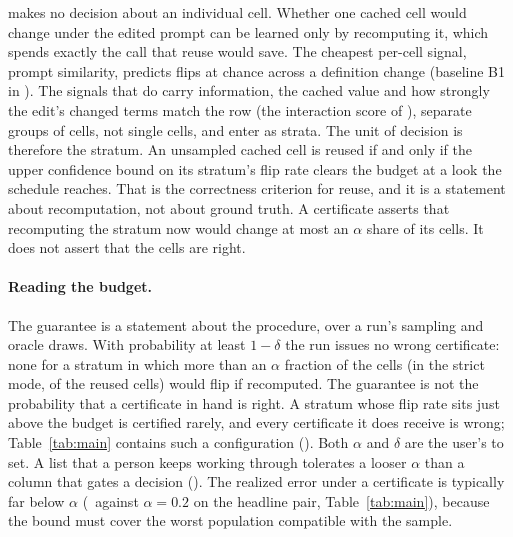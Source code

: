 \sivm{} makes no decision about an individual cell. Whether one cached
cell would change under the edited prompt can be learned only by
recomputing it, which spends exactly the call that reuse would save.
The cheapest per-cell signal, prompt similarity, predicts flips at
chance across a definition change (baseline B1 in
). The signals that do carry information, the
cached value and how strongly the edit's changed terms match the row
(the interaction score of ), separate groups of
cells, not single cells, and enter as strata. The unit of decision is therefore
the stratum. An unsampled cached cell is reused if and only if the
upper confidence bound on its stratum's flip rate clears the budget at
a look the schedule reaches. That is the correctness criterion for
reuse, and it
is a statement about recomputation, not about ground truth. A
certificate asserts that recomputing the stratum now would change at
most an $\alpha$ share of its cells. It does not assert that the cells
are right.

\keeprunin
\paragraph{Reading the budget.} The guarantee is a statement about the
procedure, over a run's sampling and oracle draws. With probability at
least $1-\delta$ the run issues no wrong certificate: none for a stratum
in which more than an $\alpha$ fraction of the cells (in the strict mode,
of the reused cells) would flip if recomputed. The guarantee is not the
probability that a certificate in hand is right. A stratum whose flip
rate sits just above the budget is certified rarely, and every
certificate it does receive is wrong; Table~\ref{tab:main} contains such
a configuration (). Both $\alpha$ and $\delta$ are
the user's to set. A list that a person keeps working through tolerates
a looser $\alpha$ than a column that gates a decision
(). The realized error
under a certificate is typically far below $\alpha$ (\benchRealized\
against $\alpha{=}0.2$ on the headline pair, Table~\ref{tab:main}),
because the bound must cover the worst population compatible with the
sample.

\keeprunin
